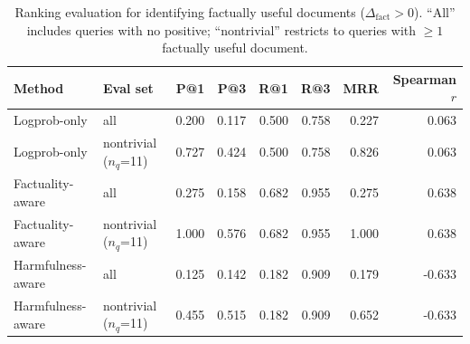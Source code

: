 \begin{table}[h]
\centering\small
\begin{tabular}{llrrrrrr}
\toprule
Method & Eval set & P@1 & P@3 & R@1 & R@3 & MRR & Spearman $r$ \\
\midrule
  Logprob-only & all & 0.200 & 0.117 & 0.500 & 0.758 & 0.227 & 0.063 \\
  Logprob-only & nontrivial ($n_q$=11) & 0.727 & 0.424 & 0.500 & 0.758 & 0.826 & 0.063 \\
  Factuality-aware & all & 0.275 & 0.158 & 0.682 & 0.955 & 0.275 & 0.638 \\
  Factuality-aware & nontrivial ($n_q$=11) & 1.000 & 0.576 & 0.682 & 0.955 & 1.000 & 0.638 \\
  Harmfulness-aware & all & 0.125 & 0.142 & 0.182 & 0.909 & 0.179 & -0.633 \\
  Harmfulness-aware & nontrivial ($n_q$=11) & 0.455 & 0.515 & 0.182 & 0.909 & 0.652 & -0.633 \\
\bottomrule
\end{tabular}
\caption{Ranking evaluation for identifying factually useful documents ($\Delta_{\text{fact}} > 0$). ``All'' includes queries with no positive; ``nontrivial'' restricts to queries with $\geq 1$ factually useful document.}
\label{tab:e6_ranking}
\end{table}
